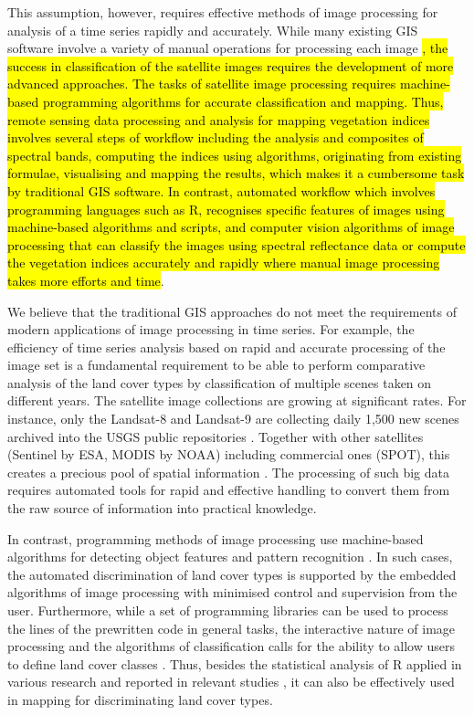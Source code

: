 \documentclass[12pt,a4paper,oneside]{article}
\def \newpar{\vspace{6pt}}
\begin{document}
\newpar This assumption, however, requires effective methods of image processing for analysis of a time series rapidly and accurately. While many existing GIS software involve a variety of manual operations for processing each image \citep{TAPPAN200738,SPIEKERMANN2015113,EPUH2022100067}\hl{, the success in classification of the satellite images requires the development of more advanced approaches. The tasks of satellite image processing requires machine-based programming algorithms for accurate classification and mapping. Thus, remote sensing data processing and analysis for mapping vegetation indices involves several steps of workflow including the analysis and composites of spectral bands, computing the indices using algorithms, originating from existing formulae, visualising and mapping the results, which makes it a cumbersome task by traditional GIS software. In contrast, automated workflow which involves programming languages such as R, recognises specific features of images using machine-based algorithms and scripts, and computer vision algorithms of image processing that can classify the images using spectral reflectance data or compute the vegetation indices accurately and rapidly where manual image processing takes more efforts and time}. 

\newpar We believe that the traditional GIS approaches do not meet the requirements of modern applications of image processing in time series. For example, the efficiency of time series analysis based on rapid and accurate processing of the image set is a fundamental requirement to be able to perform comparative analysis of the land cover types by classification of multiple scenes taken on different years. The satellite image collections are growing at significant rates. For instance, only the Landsat-8 and Landsat-9 are collecting daily 1,500 new scenes archived into the USGS public repositories \citep{USGS}. Together with other satellites (Sentinel by ESA, MODIS by NOAA) including commercial ones (SPOT), this creates a precious pool of spatial information \citep{MainiAgrawal}. The processing of such big data requires automated tools for rapid and effective handling to convert them from the raw source of information into practical knowledge. 

\newpar In contrast, programming methods of image processing use machine-based algorithms for detecting object features and pattern recognition \citep{9297369,jimaging8120317,8882177,9121731}. In such cases, the automated discrimination of land cover types is supported by the embedded algorithms of image processing with minimised control and supervision from the user. Furthermore, while a set of programming libraries can be used to process the lines of the prewritten code in general tasks, the interactive nature of image processing and the algorithms of classification calls for the ability to allow users to define land cover classes \citep{Liuetal2009}. Thus, besides the statistical analysis of R applied in various research and reported in relevant studies \citep{BIVAND20001043,Lemenkova201991,GRUNSKY20021219}, it can also be effectively used in mapping for discriminating land cover types. 
\end{document}

